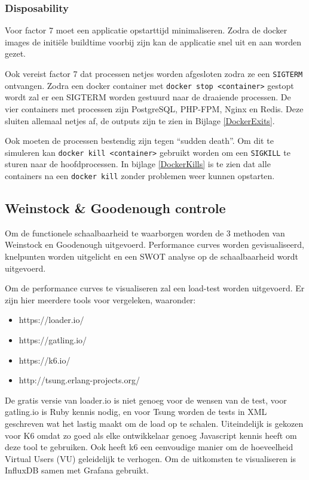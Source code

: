 \subsubsection{Disposability}
Voor factor 7 moet een applicatie opstarttijd minimaliseren. Zodra de docker images de initiële buildtime voorbij zijn kan de applicatie snel uit en aan worden gezet.

Ook vereist factor 7 dat processen netjes worden afgesloten zodra ze een \texttt{SIGTERM} ontvangen. Zodra een docker container met \texttt{docker stop <container>} gestopt wordt zal er een SIGTERM worden gestuurd naar de draaiende processen. De vier containers met processen zijn PostgreSQL, PHP-FPM, Nginx en Redis. Deze sluiten allemaal netjes af, de outputs zijn te zien in Bijlage \ref{DockerExits}.

Ook moeten de processen bestendig zijn tegen \enquote{sudden death}. Om dit te simuleren kan \texttt{docker kill <container>} gebruikt worden om een \texttt{SIGKILL} te sturen naar de hoofdprocessen. In bijlage \ref{DockerKills} is te zien dat alle containers na een \texttt{docker kill} zonder problemen weer kunnen opstarten.

\subsection{Weinstock \& Goodenough controle} \label{schaalbaarheidscontrole}
Om de functionele schaalbaarheid te waarborgen worden de 3 methoden van Weinstock en Goodenough \parencite{OnSystemScalability} uitgevoerd. Performance curves worden gevisualiseerd, knelpunten worden uitgelicht en een SWOT analyse op de schaalbaarheid wordt uitgevoerd.

Om de performance curves te visualiseren zal een load-test worden uitgevoerd. Er zijn hier meerdere tools voor vergeleken, waaronder:
\begin{itemize}
	\item https://loader.io/
	\item https://gatling.io/
	\item https://k6.io/
	\item http://tsung.erlang-projects.org/
\end{itemize}

De gratis versie van loader.io is niet genoeg voor de wensen van de test, voor gatling.io is Ruby kennis nodig, en voor Tsung worden de tests in XML geschreven wat het lastig maakt om de load op te schalen. Uiteindelijk is gekozen voor K6 omdat zo goed als elke ontwikkelaar genoeg Javascript kennis heeft om deze tool te gebruiken. Ook heeft k6 een eenvoudige manier om de hoeveelheid Virtual Users (VU) geleidelijk te verhogen. Om de uitkomsten te visualiseren is InfluxDB samen met Grafana gebruikt. 


